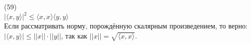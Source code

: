 (59)\\
$|\langle x, y \rangle|^2 \le \langle x, x\rangle\langle y, y\rangle$\\
Если рассматривать норму, порождённую скалярным произведением, то верно: $|\langle x, y \rangle| \le ||x||\cdot||y||$, так как $||x|| = \sqrt{\langle x, x\rangle}$.